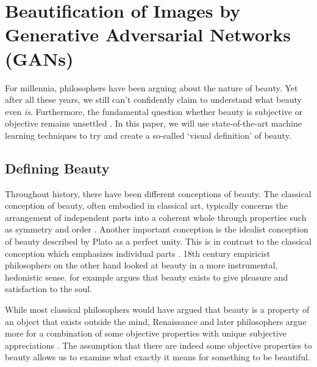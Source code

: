 \documentclass[../main.tex]{subfiles}
\begin{document}
\section{Beautification of Images by Generative Adversarial Networks (GANs)}
For millennia, philosophers have been arguing about the nature of beauty. Yet after all these years, we still can't confidently claim to understand what beauty even \textit{is}. Furthermore, the fundamental question whether beauty is subjective or objective remains unsettled \parencite{sep-beauty}. In this paper, we will use state-of-the-art machine learning techniques to try and create a so-called `visual definition' of beauty.


\subsection{Defining Beauty}
Throughout history, there have been different conceptions of beauty. The classical conception of beauty, often embodied in classical art, typically concerns the arrangement of independent parts into a coherent whole through properties such as symmetry and order \parencite{wolfflin1932principles, sep-beauty}. Another important conception is the idealist conception of beauty described by Plato as a perfect unity. This is in contrast to the classical conception which emphasizes individual parts \parencite{sep-beauty}. 18th century empiricist philosophers on the other hand looked at beauty in a more instrumental, hedonistic sense. \textcite{hume2003treatise} for example argues that beauty exists to give pleasure and satisfaction to the soul.

While most classical philosophers would have argued that beauty is a property of an object that exists outside the mind, Renaissance and later philosophers argue more for a combination of some objective properties with unique subjective appreciations \parencite{sartwell2017entanglements}. The assumption that there are indeed some objective properties to beauty allows us to examine what exactly it means for something to be beautiful.




\end{document}
